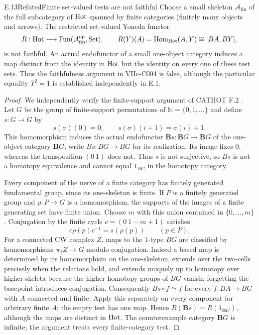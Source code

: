 \begin{result}{E.13}{Refuted}{Finite set-valued tests are not faithful}
Choose a small skeleton $\mathcal A_{\mathrm{fin}}$ of the full subcategory of $\mathrm{Hot}$ spanned by finite categories (finitely many objects and arrows). The restricted set-valued Yoneda functor
\[
 R:\mathrm{Hot}\longrightarrow
 \operatorname{Fun}(\mathcal A_{\mathrm{fin}}^{\mathrm{op}},\mathrm{Set}),
 \qquad R(Y)(A)=\operatorname{Hom}_{\mathrm{Hot}}(A,Y)\cong[BA,BY],
\]
is not faithful. An actual endofunctor of a small one-object category induces a map distinct from the identity in $\mathrm{Hot}$ but the identity on every one of these test sets. Thus the faithfulness argument in VIIc-C004 is false, although the particular equality $T^2=1$ is established independently in E.1.
\end{result}
\begin{proof}
We independently verify the finite-support argument of CATHOT F.2 \citep{SuppliedAuditsPATHS}. Let $G$ be the group of finite-support permutations of $\mathbb N=\{0,1,\ldots\}$ and define $s:G\to G$ by
\[
 s(\sigma)(0)=0,\qquad s(\sigma)(i+1)=\sigma(i)+1.
\]
This homomorphism induces the actual endofunctor $\mathbf B s:\mathbf BG\to\mathbf BG$ of the one-object category $\mathbf BG$; write $Bs:BG\to BG$ for its realization. Its image fixes $0$, whereas the transposition $(0\ 1)$ does not. Thus $s$ is not surjective, so $Bs$ is not a homotopy equivalence and cannot equal $1_{BG}$ in the homotopy category.

Every component of the nerve of a finite category has finitely generated fundamental group, since its one-skeleton is finite. If $P$ is a finitely generated group and $\rho:P\to G$ is a homomorphism, the supports of the images of a finite generating set have finite union. Choose $m$ with this union contained in $\{0,\ldots,m\}$. Conjugation by the finite cycle $c=(0\ 1\ \cdots\ m+1)$ satisfies
\[
 c\rho(p)c^{-1}=s(\rho(p))\qquad(p\in P).
\]
For a connected CW complex $Z$, maps to the $1$-type $BG$ are classified by homomorphisms $\pi_1Z\to G$ modulo conjugation. Indeed a based map is determined by its homomorphism on the one-skeleton, extends over the two-cells precisely when the relations hold, and extends uniquely up to homotopy over higher skeleta because the higher homotopy groups of $BG$ vanish; forgetting the basepoint introduces conjugation. Consequently $Bs\circ f\simeq f$ for every $f:BA\to BG$ with $A$ connected and finite. Apply this separately on every component for arbitrary finite $A$; the empty test has one map. Hence $R(\mathbf B s)=R(1_{\mathbf BG})$, although the maps are distinct in $\mathrm{Hot}$. The counterexample category $\mathbf BG$ is infinite; the argument treats every finite-category test.
\end{proof}
